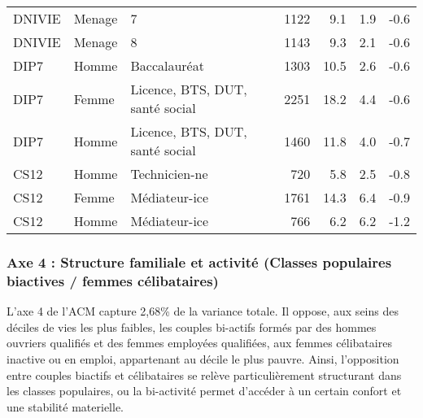 \documentclass[
  12pt,
]{book}
\begin{document}
\begin{longtable}[t]{lllrrrr}
\addlinespace
DNIVIE & Menage & 7 & 1122 & 9.1 & 1.9 & -0.6\\
DNIVIE & Menage & 8 & 1143 & 9.3 & 2.1 & -0.6\\
DIP7 & Homme & Baccalauréat & 1303 & 10.5 & 2.6 & -0.6\\
DIP7 & Femme & Licence, BTS, DUT, santé social & 2251 & 18.2 & 4.4 & -0.6\\
DIP7 & Homme & Licence, BTS, DUT, santé social & 1460 & 11.8 & 4.0 & -0.7\\
\addlinespace
CS12 & Homme & Technicien-ne & 720 & 5.8 & 2.5 & -0.8\\
CS12 & Femme & Médiateur-ice & 1761 & 14.3 & 6.4 & -0.9\\
CS12 & Homme & Médiateur-ice & 766 & 6.2 & 6.2 & -1.2\\*
\end{longtable}
\endgroup{}

\subsubsection{Axe 4 : Structure familiale et activité (Classes
populaires biactives / femmes
célibataires)}\label{axe-4-structure-familiale-et-activituxe9-classes-populaires-biactives-femmes-cuxe9libataires}

L'axe 4 de l'ACM capture 2,68\% de la variance totale. Il oppose, aux
seins des déciles de vies les plus faibles, les couples bi-actifs formés
par des hommes ouvriers qualifiés et des femmes employées qualifiées,
aux femmes célibataires inactive ou en emploi, appartenant au décile le
plus pauvre. Ainsi, l'opposition entre couples biactifs et célibataires
se relève particulièrement structurant dans les classes populaires, ou
la bi-activité permet d'accéder à un certain confort et une stabilité
materielle.

\begingroup\fontsize{7}{9}\selectfont
\end{document}
